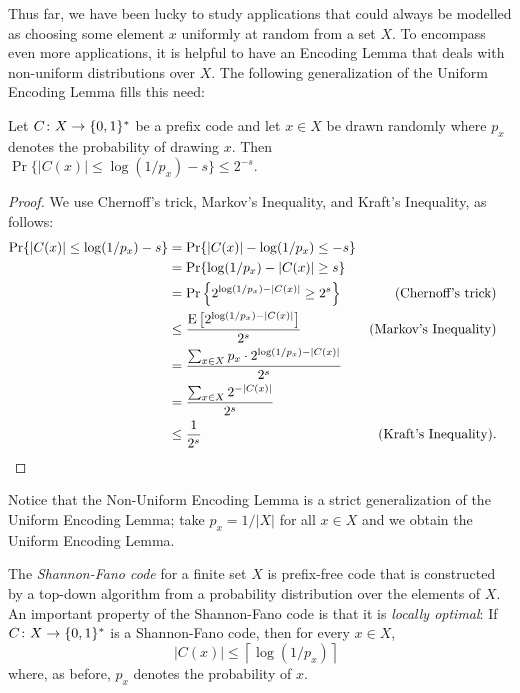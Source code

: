 \documentclass{patmorin}
\begin{document}
Thus far, we have been lucky to study applications that could always
be modelled as choosing some element $x$ uniformly at random from a
set $X$. To encompass even more applications, it is helpful to have
an Encoding Lemma that deals with non-uniform distributions over $X$.
The following generalization of the Uniform Encoding Lemma fills this
need:

\begin{lem}  
  Let $C\colon X\to\{0,1\}^*$ be a prefix code and let $x\in X$ be
  drawn randomly where $p_x$ denotes the probability of drawing $x$.
  Then $\Pr\{ |C(x)| \le \log(1/p_x)-s\} \le 2^{-s}$.
\end{lem}

\begin{proof}
  We use Chernoff's trick, Markov's Inequality, and Kraft's Inequality,
  as follows: 
  \begin{align*}
     \Pr\{ |C(x)| \le\log(1/p_x)-s \} 
      & = \Pr\{|C(x)| -\log(1/p_x) \le -s \} \\
      & = \Pr\{\log(1/p_x)-|C(x)| \ge s \} \\
      & = \Pr\left\{2^{\log(1/p_x)-|C(x)|} \ge 2^s \right\} & \text{(Chernoff's trick)} \\
      & \le \frac{\mathrm{E}\left[2^{\log(1/p_x)-|C(x)|}\right]}{2^s} & \text{(Markov's Inequality)} \\
      & = \frac{\sum_{x\in X}p_x\cdot 2^{\log(1/p_x)-|C(x)|}}{2^s} \\
      & = \frac{\sum_{x\in X}2^{-|C(x)|}}{2^s} \\
      & \le \frac{1}{2^s} & \text{(Kraft's Inequality).}  & \qedhere
  \end{align*}
\end{proof}

Notice that the Non-Uniform Encoding Lemma is a strict generalization
of the Uniform Encoding Lemma; take $p_x=1/|X|$ for all $x\in X$
and we obtain the Uniform Encoding Lemma.

The \emph{Shannon-Fano code} \cite{fano:transmission,shannon:mathematical}
for a finite set $X$ is prefix-free code that is constructed by a top-down
algorithm from a probability distribution over the elements of $X$. An
important property of the Shannon-Fano code is that it is \emph{locally
optimal}: If $C\colon X\to\{0,1\}^*$ is a Shannon-Fano code, then for every $x\in X$,
\[
    |C(x)| \le \left\lceil\log(1/p_x)\right\rceil \enspace 
\]
where, as before, $p_x$ denotes the probability of $x$.
\end{document}

